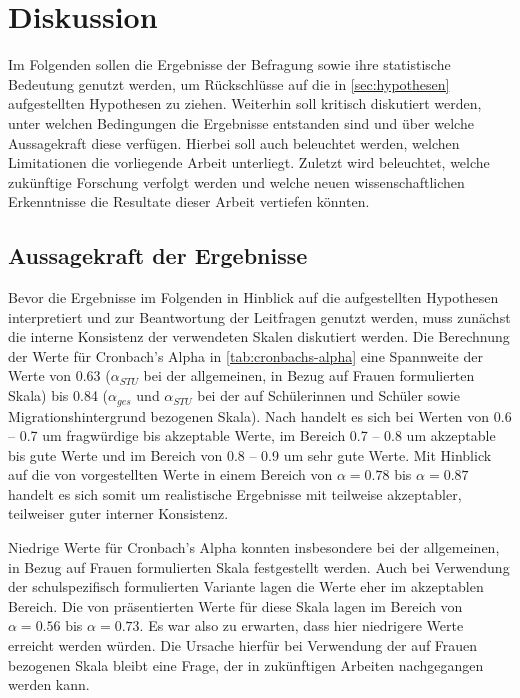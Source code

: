 \chapter{Diskussion}
\label{ch:diskussion}

Im Folgenden sollen die Ergebnisse der Befragung sowie ihre statistische Bedeutung genutzt werden, um Rückschlüsse auf die in \autoref{sec:hypothesen} aufgestellten Hypothesen zu ziehen.
Weiterhin soll kritisch diskutiert werden, unter welchen Bedingungen die Ergebnisse entstanden sind und über welche Aussagekraft diese verfügen.
Hierbei soll auch beleuchtet werden, welchen Limitationen die vorliegende Arbeit unterliegt.
Zuletzt wird beleuchtet, welche zukünftige Forschung verfolgt werden und welche neuen wissenschaftlichen Erkenntnisse die Resultate dieser Arbeit vertiefen könnten.


\section{Aussagekraft der Ergebnisse}

Bevor die Ergebnisse im Folgenden in Hinblick auf die aufgestellten Hypothesen interpretiert und zur Beantwortung der Leitfragen genutzt werden, muss zunächst die interne Konsistenz der verwendeten Skalen diskutiert werden.
Die Berechnung der Werte für Cronbach's Alpha in \autoref{tab:cronbachs-alpha} eine Spannweite der Werte von 0.63 ($\alpha_{STU}$ bei der allgemeinen, in Bezug auf Frauen formulierten Skala) bis 0.84 ($\alpha_{ges}$ und $\alpha_{STU}$ bei der auf Schülerinnen und Schüler sowie Migrationshintergrund bezogenen Skala).
Nach \citet{streiner2003starting} handelt es sich bei Werten von 0.6 -- 0.7 um fragwürdige bis akzeptable Werte, im Bereich 0.7 -- 0.8 um akzeptable bis gute Werte und im Bereich von 0.8 -- 0.9 um sehr gute Werte.
Mit Hinblick auf die von \citet{perry2015modern} vorgestellten Werte in einem Bereich von $\alpha = 0.78$ bis $\alpha = 0.87$ handelt es sich somit um realistische Ergebnisse mit teilweise akzeptabler, teilweiser guter interner Konsistenz.

Niedrige Werte für Cronbach's Alpha konnten insbesondere bei der allgemeinen, in Bezug auf Frauen formulierten Skala festgestellt werden.
Auch bei Verwendung der schulspezifisch formulierten Variante lagen die Werte eher im akzeptablen Bereich.
Die von \citet{bonefeld2022reflexion} präsentierten Werte für diese Skala lagen im Bereich von $\alpha = 0.56$ bis $\alpha = 0.73$.
Es war also zu erwarten, dass hier niedrigere Werte erreicht werden würden.
Die Ursache hierfür bei Verwendung der auf Frauen bezogenen Skala bleibt eine Frage, der in zukünftigen Arbeiten nachgegangen werden kann.

